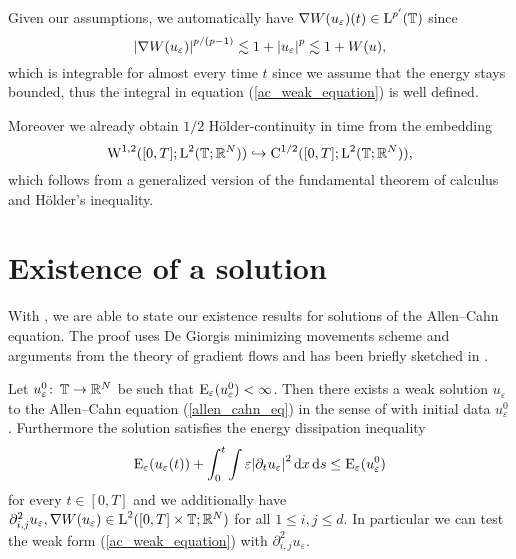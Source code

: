 \begin{remark}
	Given our assumptions, we automatically have $ \nabla W ( u_{ \varepsilon } ) ( t ) \in \operatorname{L}^{ p' } ( \operatorname{\mathbb{T}} ) $ since
	\begin{equation}
		\abs{ \nabla W ( u_{ \varepsilon} ) }^{ p/(p-1) }
		\lesssim
		1+ \abs{u_{ \varepsilon }}^{ p }
		\lesssim
		1 + W ( u ),
	\end{equation}
	which is integrable for almost every time $ t $ since we assume that the energy stays bounded,
	thus the integral in equation (\ref{ac_weak_equation}) is well defined.
	
	Moreover we already obtain $ 1/2 $ Hölder-continuity in time from the embedding
	\begin{equation}
		\label{w12_embeds_into_c1half}
		\operatorname{W}^{ 1 , 2} ( [ 0 , T ] ; \operatorname{L}^{ 2 } ( \operatorname{\mathbb{T}};\mathbb{ R }^{ N } ) )
		\hookrightarrow
		\operatorname{C}^{ 1/2 } ( [ 0 , T ] ; \operatorname{L}^{ 2 } ( \operatorname{\mathbb{T}} ; \mathbb{ R }^{ N } ) ),
	\end{equation}
	which follows from a generalized version of the fundamental theorem of calculus and Hölder's inequality.
\end{remark}

\section{Existence of a solution}

With , we are able to state our existence results for solutions of the Allen--Cahn equation. The proof uses De Giorgis minimizing movements scheme and arguments from the theory of gradient flows and has been briefly sketched in \cite{convergence_of_allen_cahn_equation_to_multiphase_mean_curvature_flow}.

\begin{theorem}
	\label{existence_of_ac_solution}
	Let $ u_{ \varepsilon}^{ 0 } \colon \operatorname{\mathbb{T}} \to \mathbb{ R }^{ N } $ be such that 
	$ \operatorname{E}_{ \varepsilon } ( u_{ \varepsilon}^{ 0 } ) < \infty $.
	Then there exists a weak solution $ u_{ \varepsilon} $ to the Allen--Cahn equation (\ref{allen_cahn_eq}) in the sense of  with initial data $ u_{ \varepsilon}^{ 0 } $.
	Furthermore the solution satisfies the energy dissipation inequality
	\begin{equation}
		\label{energy_dissipation_sharp}
		\operatorname{E}_{ \varepsilon } ( u_{ \varepsilon } ( t ) )
		+
		\int_{ 0 }^{ t }
			\int
				\varepsilon \abs{ \partial_{ t } u_{ \varepsilon } }^{ 2 }
			\dd{ x }
		\dd{ s }
		\leq
		\operatorname{E}_{ \varepsilon } ( u_{ \varepsilon}^{ 0 } )
	\end{equation}
	for every $ t \in [ 0 , T ] $ and we additionally have
	$
		\partial_{ i , j }^{ 2 } u_{ \varepsilon }, \nabla W ( u_{ \varepsilon } ) \in \operatorname{L}^{ 2 } ( [0, T] \times \operatorname{\mathbb{T}} ; \mathbb{ R }^{ N } ) 
	$
	for all $ 1 \leq i, j \leq d $. In particular we can test the weak form (\ref{ac_weak_equation}) with $ \partial_{ i , j }^{ 2 } u_{ \varepsilon } $.
\end{theorem}

